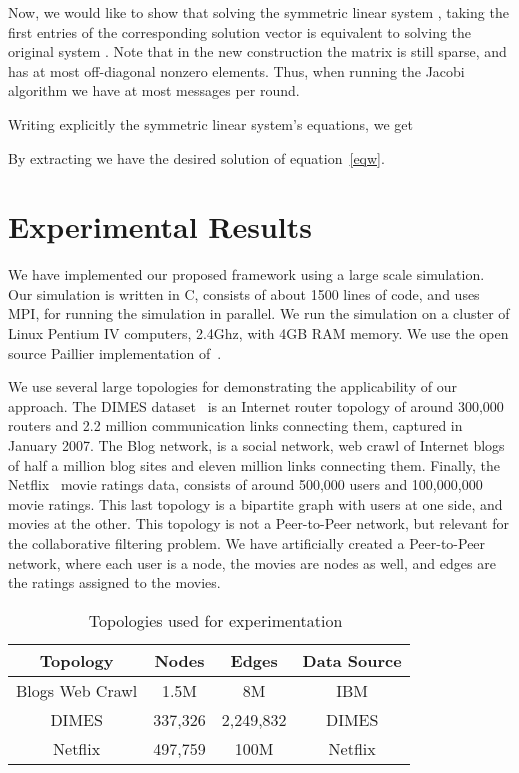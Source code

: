 \documentclass[times, 10pt,twocolumn]{article}
\begin{document}
Now, we would like to show that solving the symmetric linear
system , taking the first 
entries of the corresponding solution vector  is
equivalent to solving the original system . Note that
in the new construction the matrix  is still sparse,
and has at most  off-diagonal nonzero elements. Thus, when
running the Jacobi algorithm we have at most  messages per
round.

Writing explicitly the symmetric linear system's equations, we get


By extracting  we have  the desired solution of
equation~\ref{eqw}.

\section{Experimental Results}
\label{exp} We have implemented our proposed framework using a
large scale simulation. Our simulation is written in C, consists
of about 1500 lines of code, and uses MPI, for running the
simulation in parallel. We run the simulation on a cluster of
Linux Pentium IV computers, 2.4Ghz, with 4GB RAM memory. We use
the open source Paillier implementation of~\cite{PaillierIMP}.

We use several large topologies for demonstrating the
applicability of our approach. The DIMES dataset~\cite{DIMES} is
an Internet router topology of around 300,000 routers and 2.2
million communication links connecting them, captured in January
2007. The Blog network, is a social network, web crawl of Internet
blogs of half a million blog sites and eleven million links
connecting them. Finally, the Netflix~\cite{Netflix} movie ratings
data, consists of around 500,000 users and 100,000,000 movie
ratings. This last topology is a bipartite graph with users at one
side, and movies at the other. This topology is not a Peer-to-Peer
network, but relevant for the collaborative filtering problem. We
have artificially created a Peer-to-Peer network, where each user
is a node, the movies are nodes as well, and edges are the ratings
assigned to the movies.

\begin{table}[h!]
\begin{center}
\begin{tabular}{|c|c|c|c|}
  \hline
Topology & Nodes & Edges & Data Source \\
  \hline
  Blogs Web Crawl & 1.5M & 8M & IBM \\
  DIMES & 337,326  & 2,249,832 & DIMES  \\
  Netflix & 497,759 & 100M & Netflix \\
  \hline
\end{tabular}
\caption{\mbox{              } Topologies used for
experimentation}
\end{center}
\end{table}
\vspace{-5mm}
\end{document}

